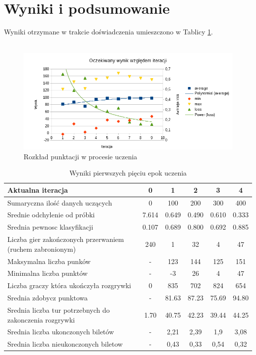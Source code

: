 \documentclass[12pt, oneside]{report}
\begin{document}
	\section{Wyniki i podsumowanie}
	Wyniki otrzymane w trakcie doświadczenia umieszczono w Tablicy \ref{table:learn_metrics}. \\ \\
	
	\begin{figure}
		\includegraphics[width=\linewidth]{WykresPunktowPosteIteracji.png}
		\caption{Rozkład punktacji w procesie uczenia}
		\label{figure:learn_results}
	\end{figure}
	
	\begin{table}[h]
		\begin{center}
			\begin{tabular}{| p{6cm} | c | c | c | c | c |} \hline
				Aktualna iteracja & 0 & 1 & 2 & 3 & 4 \\ \hline
				Sumaryczna ilość danych uczących & 0 & 100 & 200 & 300 & 400 \\ \hline
				Srednie odchylenie od próbki & 7.614 & 0.649 & 0.490 & 0.610 & 0.333 \\ \hline
				Srednia pewnosc klasyfikacji & 0.107 & 0.689 & 0.800 & 0.692 & 0.885 \\ \hline
				Liczba gier zakończonych przerwaniem (ruchem zabronionym) & 240 & 1 & 32 & 4 & 47 \\ \hline
				Maksymalna liczba punków & - & 123 & 144 & 125 & 151 \\ \hline
				Minimalna liczba punktów & - & -3 & 26 & 4 & 47 \\ \hline
				Liczba graczy która ukończyła rozgrywki & 0 & 835 & 702 & 824 & 654 \\ \hline
				Srednia zdobycz punktowa & - & 81.63 & 87.23 & 75.69 & 94.80 \\ \hline
				Srednia liczba tur potrzebnych do zakonczenia rozgrywki & 1.70 & 40.75 & 42.23 & 39.44 & 44.25 \\ \hline
				Srednia liczba ukonczonych biletów & - & 2,21 & 2,39 & 1,9 & 3,08 \\ \hline
				Srednia liczba nieukonczonych biletow & - & 0,43 & 0,33 & 0,54 & 0,32 \\ \hline
			\end{tabular}	
			\caption{Wyniki pierwszych pięciu epok uczenia}
			\label{table:learn_metrics}
		\end{center}
	\end{table}
	
\end{document}
